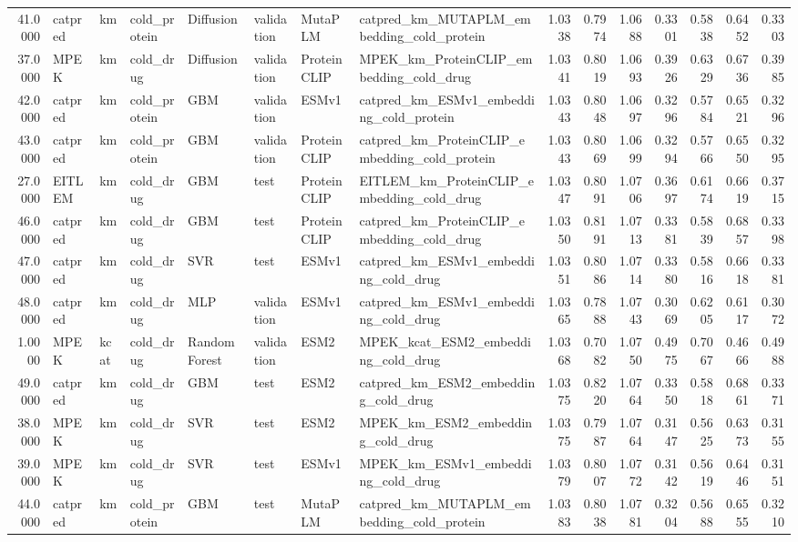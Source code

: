 \begin{tabular}{rlllllllrrrrrrr}
41.0000 & catpred & km & cold_protein & Diffusion & validation & MutaPLM & catpred_km_MUTAPLM_embedding_cold_protein & 1.0338 & 0.7974 & 1.0688 & 0.3301 & 0.5838 & 0.6452 & 0.3303 \\
37.0000 & MPEK & km & cold_drug & Diffusion & validation & ProteinCLIP & MPEK_km_ProteinCLIP_embedding_cold_drug & 1.0341 & 0.8019 & 1.0693 & 0.3926 & 0.6329 & 0.6736 & 0.3985 \\
42.0000 & catpred & km & cold_protein & GBM & validation & ESMv1 & catpred_km_ESMv1_embedding_cold_protein & 1.0343 & 0.8048 & 1.0697 & 0.3296 & 0.5784 & 0.6521 & 0.3296 \\
43.0000 & catpred & km & cold_protein & GBM & validation & ProteinCLIP & catpred_km_ProteinCLIP_embedding_cold_protein & 1.0343 & 0.8069 & 1.0699 & 0.3294 & 0.5766 & 0.6550 & 0.3295 \\
27.0000 & EITLEM & km & cold_drug & GBM & test & ProteinCLIP & EITLEM_km_ProteinCLIP_embedding_cold_drug & 1.0347 & 0.8091 & 1.0706 & 0.3697 & 0.6174 & 0.6619 & 0.3715 \\
46.0000 & catpred & km & cold_drug & GBM & test & ProteinCLIP & catpred_km_ProteinCLIP_embedding_cold_drug & 1.0350 & 0.8191 & 1.0713 & 0.3381 & 0.5839 & 0.6857 & 0.3398 \\
47.0000 & catpred & km & cold_drug & SVR & test & ESMv1 & catpred_km_ESMv1_embedding_cold_drug & 1.0351 & 0.8086 & 1.0714 & 0.3380 & 0.5816 & 0.6618 & 0.3381 \\
48.0000 & catpred & km & cold_drug & MLP & validation & ESMv1 & catpred_km_ESMv1_embedding_cold_drug & 1.0365 & 0.7888 & 1.0743 & 0.3069 & 0.6205 & 0.6117 & 0.3072 \\
1.0000 & MPEK & kcat & cold_drug & Random Forest & validation & ESM2 & MPEK_kcat_ESM2_embedding_cold_drug & 1.0368 & 0.7082 & 1.0750 & 0.4975 & 0.7067 & 0.4666 & 0.4988 \\
49.0000 & catpred & km & cold_drug & GBM & test & ESM2 & catpred_km_ESM2_embedding_cold_drug & 1.0375 & 0.8220 & 1.0764 & 0.3350 & 0.5818 & 0.6861 & 0.3371 \\
38.0000 & MPEK & km & cold_drug & SVR & test & ESM2 & MPEK_km_ESM2_embedding_cold_drug & 1.0375 & 0.7987 & 1.0764 & 0.3147 & 0.5625 & 0.6373 & 0.3155 \\
39.0000 & MPEK & km & cold_drug & SVR & test & ESMv1 & MPEK_km_ESMv1_embedding_cold_drug & 1.0379 & 0.8007 & 1.0772 & 0.3142 & 0.5619 & 0.6446 & 0.3151 \\
44.0000 & catpred & km & cold_protein & GBM & test & MutaPLM & catpred_km_MUTAPLM_embedding_cold_protein & 1.0383 & 0.8038 & 1.0781 & 0.3204 & 0.5688 & 0.6555 & 0.3210 \\

\end{tabular}
